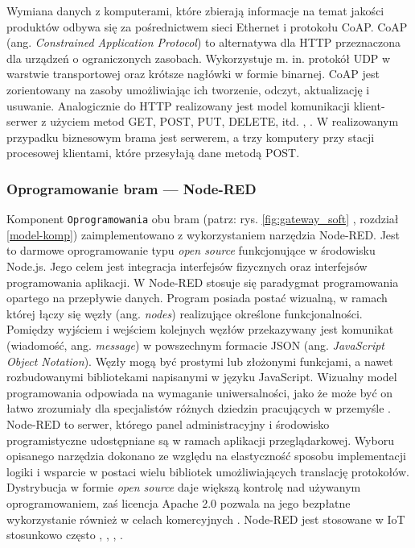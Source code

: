 \documentclass[a4paper, 12pt, twoside]{article}
\begin{document}
Wymiana danych z komputerami, które zbierają informacje na temat jakości produktów odbywa się
za pośrednictwem sieci Ethernet i protokołu CoAP. CoAP (ang. \emph{Constrained Application Protocol})
to alternatywa dla HTTP przeznaczona dla urządzeń o ograniczonych zasobach.
Wykorzystuje m. in. protokół UDP w warstwie transportowej oraz krótsze nagłówki w formie binarnej.
CoAP jest zorientowany na zasoby umożliwiając ich tworzenie, odczyt, aktualizację
i usuwanie. Analogicznie do HTTP realizowany jest model komunikacji
klient-serwer z użyciem metod GET, POST, PUT, DELETE, itd. \cite{intro-to-iot}, \cite{iot-hype-to-reality}.
W realizowanym przypadku biznesowym brama jest serwerem, a trzy komputery
przy stacji procesowej klientami, które przesyłają dane metodą POST.

\subsubsection{Oprogramowanie bram --- Node-RED}
Komponent \texttt{Oprogramowania} obu bram (patrz: rys. \ref{fig:gateway_soft} , rozdział \ref{model-komp})
zaimplementowano z wykorzystaniem
narzędzia Node-RED. Jest to darmowe oprogramowanie typu \emph{open source} funkcjonujące
w środowisku Node.js. Jego celem jest integracja interfejsów
fizycznych oraz interfejsów programowania aplikacji.
W Node-RED stosuje się paradygmat programowania opartego na przepływie danych.
Program posiada postać wizualną, w ramach której łączy się węzły (ang. \emph{nodes})
realizujące określone funkcjonalności. Pomiędzy wyjściem i wejściem kolejnych
węzłów przekazywany jest komunikat (wiadomość, ang. \emph{message}) w powszechnym formacie
JSON (ang. \emph{JavaScript Object Notation}). Węzły mogą być prostymi lub złożonymi
funkcjami, a nawet rozbudowanymi bibliotekami napisanymi w języku JavaScript.
Wizualny model programowania odpowiada na wymaganie uniwersalności,
jako że może być on łatwo zrozumiały dla specjalistów różnych dziedzin pracujących w przemyśle
\cite{flow-programming}.
Node-RED to serwer, którego panel administracyjny i środowisko programistyczne
udostępniane są w ramach aplikacji przeglądarkowej. Wyboru opisanego
narzędzia dokonano ze względu na elastyczność sposobu implementacji logiki i
wsparcie w postaci wielu bibliotek umożliwiających translację protokołów.
Dystrybucja w formie \emph{open source} daje większą kontrolę nad używanym oprogramowaniem,
zaś licencja Apache 2.0 pozwala na jego bezpłatne wykorzystanie również
w celach komercyjnych \cite{node-red}. Node-RED jest stosowane w IoT stosunkowo często \cite{iot-gateway-medical-and-industrial},
\cite{design-impl-node-gateway}, \cite{iiot-opensource-gateway}, \cite{low-cost-esp32-pi-node-red-scada}.
\end{document}

